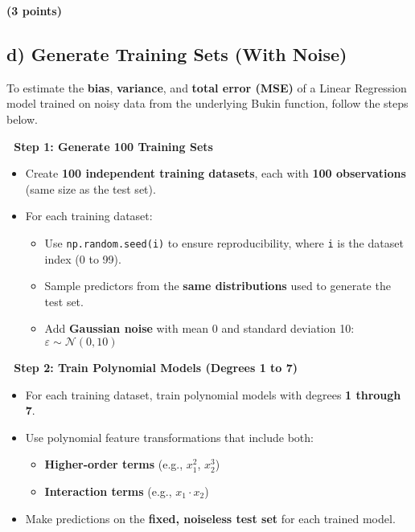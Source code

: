 \documentclass[
  letterpaper,
  DIV=11,
  numbers=noendperiod]{scrreprt}
\providecommand{\tightlist}{%
  \setlength{\itemsep}{0pt}\setlength{\parskip}{0pt}}\usepackage{longtable,booktabs,array}
\begin{document}
\textbf{(3 points)}

\subsection{d) Generate Training Sets (With
Noise)}\label{d-generate-training-sets-with-noise}

To estimate the \textbf{bias}, \textbf{variance}, and \textbf{total
error (MSE)} of a Linear Regression model trained on noisy data from the
underlying Bukin function, follow the steps below.

\textbf{🔁 Step 1: Generate 100 Training Sets}

\begin{itemize}
\tightlist
\item
  Create \textbf{100 independent training datasets}, each with
  \textbf{100 observations} (same size as the test set).
\item
  For each training dataset:

  \begin{itemize}
  \tightlist
  \item
    Use \texttt{np.random.seed(i)} to ensure reproducibility, where
    \texttt{i} is the dataset index (0 to 99).
  \item
    Sample predictors from the \textbf{same distributions} used to
    generate the test set.
  \item
    Add \textbf{Gaussian noise} with mean 0 and standard deviation 10:\\
    \(\varepsilon \sim \mathcal{N}(0, 10)\)
  \end{itemize}
\end{itemize}

\textbf{🧠 Step 2: Train Polynomial Models (Degrees 1 to 7)}

\begin{itemize}
\tightlist
\item
  For each training dataset, train polynomial models with degrees
  \textbf{1 through 7}.
\item
  Use polynomial feature transformations that include both:

  \begin{itemize}
  \tightlist
  \item
    \textbf{Higher-order terms} (e.g., \(x_1^2\), \(x_2^3\))
  \item
    \textbf{Interaction terms} (e.g., \(x_1 \cdot x_2\))
  \end{itemize}
\item
  Make predictions on the \textbf{fixed, noiseless test set} for each
  trained model.
\end{itemize}
\end{document}
